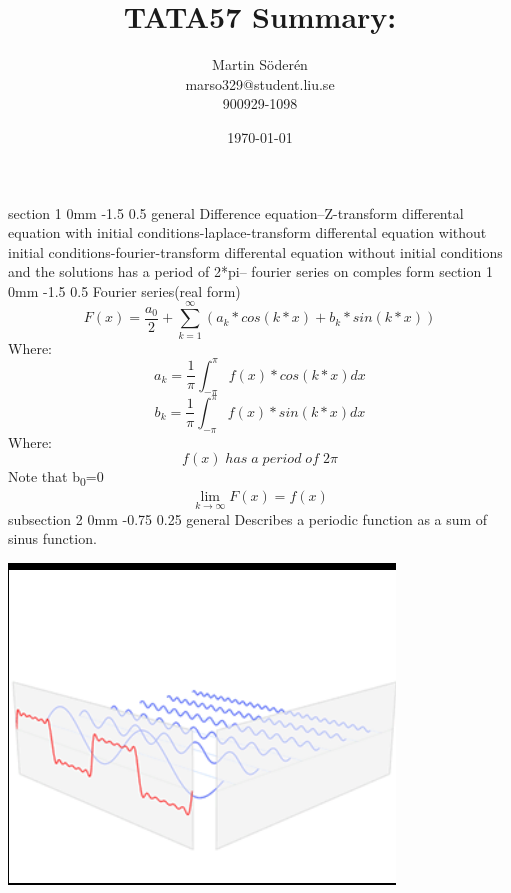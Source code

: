 \documentclass[a4paper,11pt]{article}
\makeatletter
\renewcommand{\section}{\@startsection
   {section}%
   {1}%
   {0mm}%
   {-1.5\baselineskip}%
   {0.5\baselineskip}%
   {\sffamily\bfseries\upshape\normalsize}}%
\renewcommand{\subsection}{\@startsection
   {subsection}%
   {2}%
   {0mm}%
   {-0.75\baselineskip}%
   {0.25\baselineskip}%
   {\rmfamily\normalfont\slshape\normalsize}}%
\makeatother
\begin{document}
\begin{titlepage}
\title{TATA57 Summary:}
\author{Martin Söderén\\ marso329@student.liu.se\\900929-1098}
\date{\today}
\maketitle
\vfill %
\thispagestyle{empty}
\end{titlepage}

\section{general}
Difference equation--Z-transform \newline
differental equation with initial conditions-laplace-transform \newline
differental equation without initial conditions-fourier-transform
differental equation without initial conditions and the solutions has a period of 2*pi-- fourier series on comples form
\section{Fourier series(real form)}
$$F(x)=\dfrac{a_0}{2}+\sum_{k=1}^{\infty}(a_k*cos(k*x)+b_k*sin(k*x))$$
Where:
$$a_k=\dfrac{1}{\pi}\int_{-\pi}^{\pi}f(x)*cos(k*x)dx$$
$$b_k=\dfrac{1}{\pi}\int_{-\pi}^{\pi}f(x)*sin(k*x)dx$$
Where:
	$$f(x)\; has\;a\;period \; of \; 2 \pi$$
Note that b\textsubscript{0}=0
$$\lim_{k \to \infty} F(x) = f(x)$$
\subsection{general}
Describes a periodic function as a sum of sinus function.
\newline
\centerline{\includegraphics[scale=0.6]{fseries}}
\end{document}
